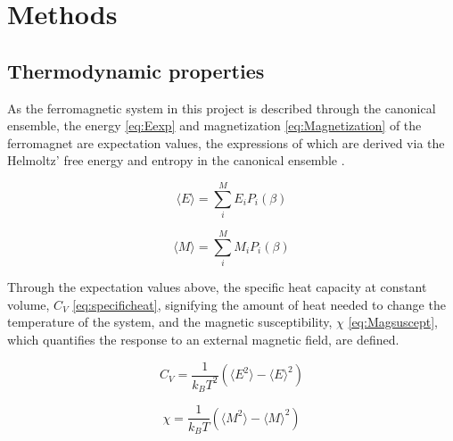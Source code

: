 \documentclass[%
oneside,                 %
final,                   %
10pt]{article}
\begin{document}
\section{Methods}

\subsection{Thermodynamic properties}
\label{SS:thermodynamic.properties}	
As the ferromagnetic system in this project is described through the 
canonical ensemble, the energy \eqref{eq:Eexp} and magnetization \eqref{eq:Magnetization} of the ferromagnet are expectation values, the expressions of which are derived via the Helmoltz' free energy and entropy in the canonical ensemble \cite{HJ-SP}. 


\begin{equation}
\langle E \rangle = \sum_i^M E_i P_i (\beta)
\label{eq:Eexp}
\end{equation}

\begin{equation}
\langle M \rangle=\sum_i^M M_i P_i (\beta)
\label{eq:Magnetization}
\end{equation}

Through the expectation values above, the specific heat capacity at constant volume, $C_V$ \eqref{eq:specificheat}, signifying the amount of heat needed to change the temperature of the system, and the magnetic susceptibility, $\chi$ \eqref{eq:Magsuscept}, which quantifies the response to an external magnetic field, are defined. 

\begin{equation}
C_V=\frac{1}{k_B T^2} (\langle E^2 \rangle - \langle E \rangle^2 )
\label{eq:specificheat}
\end{equation}

\begin{equation}
\chi=\frac{1}{k_B T}(\langle M^2 \rangle - \langle M \rangle^2 )
\label{eq:Magsuscept}
\end{equation}	
\end{document}

